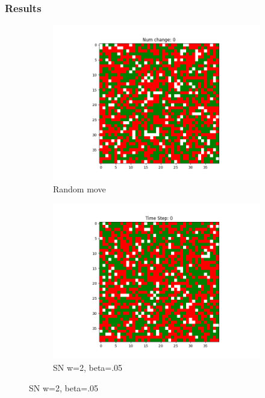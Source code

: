 \documentclass[11pt]{article}
\begin{document}
	\subsubsection{Results}
	\begin{figure}[h]
		\centering
		\begin{subfigure}{0.14\textwidth}
			\includegraphics[width=\linewidth]{initial_random.png}
			\caption{\centering Random move}
		\end{subfigure}\hfill
		\begin{subfigure}{0.14\textwidth}
			\includegraphics[width=\linewidth]{initial_cluster_w5b10.png}
			\caption{\centering SN w=2, beta=.05}
		\end{subfigure}\hfill

\end{figure}
\end{document}
